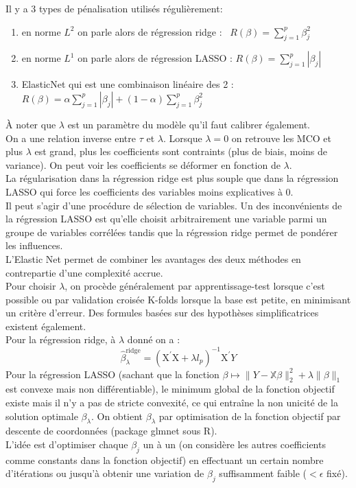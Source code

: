 \documentclass[french]{article}
\begin{document}
\begin{multicols}{2}
\noindent Il y a 3 types de pénalisation utilisés régulièrement: 
\begin{enumerate}
    \item en norme $L^{2}$ on parle alors de régression ridge  : \ $R(\beta)=\sum_{j=1}^{p}\beta_{j}^{2}$
    \item en norme $L^{1}$ on parle alors de régression LASSO  : $R(\beta)=\sum_{j=1}^{p}\left|\beta_{j}\right|$
    \item ElasticNet qui est une combinaison linéaire des 2 : $R(\beta)=\alpha \sum_{j=1}^{p}\left|\beta_{j}\right|+(1-\alpha) \sum_{j=1}^{p} \beta_{j}^{2}$
\end{enumerate}

À noter que $\lambda$ est un paramètre du modèle qu'il faut calibrer également.\\
On a une relation inverse entre $\tau$ et $\lambda$. Lorsque $\lambda=0$ on retrouve les MCO et plus $\lambda$ est grand, plus les coefficients sont contraints (plus de biais, moins de variance).
On peut voir les coefficients se déformer en fonction de $\lambda$.\\
La régularisation dans la régression ridge est plus souple que dans la régression LASSO qui force les coefficients des variables moins explicatives à 0.\\ Il peut s'agir d'une procédure de sélection de variables.
Un des inconvénients de la régression LASSO est qu'elle choisit arbitrairement une variable parmi un groupe de variables corrélées tandis que la régression ridge permet de pondérer les influences.\\
L'Elastic Net permet de combiner les avantages des deux méthodes en contrepartie d'une complexité accrue.\\

Pour choisir $\lambda$, on procède généralement par apprentissage-test lorsque c'est possible ou par validation croisée K-folds lorsque la base est petite, en minimisant un critère d'erreur. Des formules basées sur des hypothèses simplificatrices existent également.\\

\noindent Pour la régression ridge, à $\lambda$ donné on a : $$ \hat{\beta}_{\lambda}^{\text {ridge}}=\left(\mathrm{X}^{\prime} \mathrm{X}+\lambda l_{p}\right)^{-1} \mathrm{X}^{\prime} Y$$
Pour la régression LASSO (sachant que la fonction $\beta \mapsto\|Y-\mathbb{X} \beta\|_{2}^{2}+\lambda\|\beta\|_{1}$ est convexe mais non différentiable), le minimum global de la fonction objectif existe mais il n'y a pas de stricte convexité, ce qui entraîne la non unicité de la solution optimale $\beta_{\lambda}$.
On obtient $\beta_{\lambda}$ par optimisation de la fonction objectif par descente de coordonnées (package glmnet sous R).\\
L'idée est d'optimiser chaque $\beta_j$ un à un \cite{fromont} (on considère les autres coefficients comme constants dans la fonction objectif) en effectuant un certain nombre d'itérations ou jusqu'à obtenir une variation de $\beta_j$ suffisamment faible ($ <\epsilon $ fixé).


\end{multicols}
\end{document}
